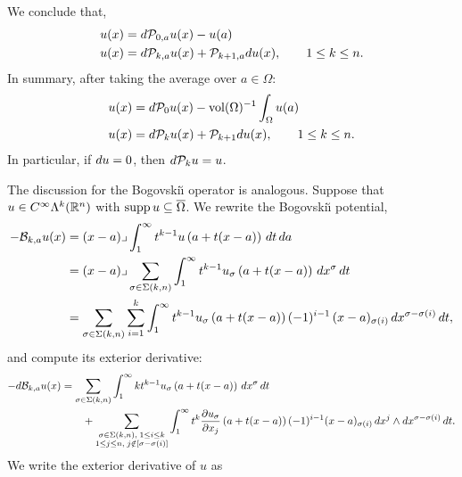 \documentclass[10pt,a4paper]{article}
\begin{document}
We conclude that, 
\begin{align*}
    u(x) &= d {\mathcal P}_{0,a} u(x) - u(a)
    \\
    u(x) &= d {\mathcal P}_{k,a} u(x) + {\mathcal P}_{k+1,a} d u(x), \qquad 1 \leq k \leq n.
\end{align*}
In summary, after taking the average over $a \in \Omega$:
\begin{align*}
    u(x) &= d {\mathcal P}_{0} u(x) - \operatorname{vol}(\Omega)^{-1} \int_\Omega u(a)
    \\
    u(x) &= d {\mathcal P}_{k} u(x) + {\mathcal P}_{k+1} d u(x), \qquad 1 \leq k \leq n.
\end{align*}
In particular, if $d u = 0$, then $d {\mathcal P}_{k} u = u$.




The discussion for the Bogovski\u{\i} operator is analogous. 
Suppose that $u \in C^{\infty}\Lambda^{k}({\mathbb R}^n)$ with $\operatorname{supp} u \subseteq \overline\Omega$.
We rewrite the Bogovski\u{\i} potential,
\begin{align*}
    - 
    {\mathcal B}_{k,a} u(x) 
    &= 
    (x-a)\lrcorner \int_{1}^\infty t^{k-1} u\left(a+t(x-a)\right)\,dt\,da\;
    \\&
    = 
    (x-a)\lrcorner 
    \sum_{\sigma \in \Sigma(k,n)}
    \int_{1}^\infty 
    t^{k-1} u_{\sigma}\left(a+t(x-a)\right) \,dx^{\sigma} \,dt 
    \\&
    = 
    \sum_{\sigma \in \Sigma(k,n)} \sum_{i=1}^{k}
    \int_{1}^\infty 
    t^{k-1} u_{\sigma}\left(a+t(x-a)\right) (-1)^{i-1} \,(x-a)_{\sigma(i) } \,dx^{\sigma-\sigma(i)} \,dt 
    ,
\end{align*}
and compute its exterior derivative:
\begin{align*}
    - 
    d {\mathcal B}_{k,a} u(x) 
    &= 
    \sum_{\sigma \in \Sigma(k,n)} 
    \int_{1}^\infty 
    k t^{k-1} u_{\sigma}\left(a+t(x-a)\right) \,dx^{\sigma} \,dt 
    \\&\qquad
    + 
    \sum_{\substack{ \sigma \in \Sigma(k,n), \; 1 \leq i \leq k \\ 1 \leq j \leq n, \; j \notin [\sigma-\sigma(i)] }}
    \int_{1}^\infty 
    t^{k} \frac{ \partial u_{\sigma} }{\partial x_{j}}\left(a+t(x-a)\right) (-1)^{i-1} (x-a)_{\sigma(i) } \,dx^{j} \wedge dx^{\sigma-\sigma(i)} \,dt 
    .
\end{align*}
We write the exterior derivative of $u$ as 
\end{document}
